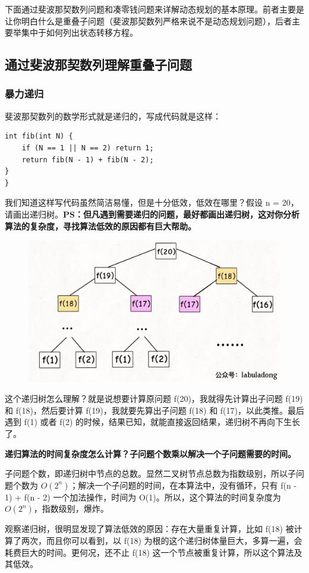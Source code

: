 \documentclass[12pt]{article}
\begin{document}
下面通过斐波那契数列问题和凑零钱问题来详解动态规划的基本原理。前者主要是让你明白什么是重叠子问题（斐波那契数列严格来说不是动态规划问题），后者主要举集中于如何列出状态转移方程。

\subsection{通过斐波那契数列理解重叠子问题}
\subsubsection{暴力递归}
斐波那契数列的数学形式就是递归的，写成代码就是这样：
\begin{lstlisting}
int fib(int N) {
    if (N == 1 || N == 2) return 1;
    return fib(N - 1) + fib(N - 2);
}
}
\end{lstlisting}

我们知道这样写代码虽然简洁易懂，但是十分低效，低效在哪里？假设 n = 20，请画出递归树。\textbf{PS：但凡遇到需要递归的问题，最好都画出递归树，这对你分析算法的复杂度，寻找算法低效的原因都有巨大帮助。}
\begin{figure}[H]
    \centering
    \includegraphics[width=.5\textwidth]{fig/Dynamic_Programming_Recursion_Tree_1.jpg}
\end{figure}

这个递归树怎么理解？就是说想要计算原问题 f(20)，我就得先计算出子问题 f(19) 和 f(18)，然后要计算 f(19)，我就要先算出子问题 f(18) 和 f(17)，以此类推。最后遇到 f(1) 或者 f(2) 的时候，结果已知，就能直接返回结果，递归树不再向下生长了。

\textbf{递归算法的时间复杂度怎么计算？子问题个数乘以解决一个子问题需要的时间。}

子问题个数，即递归树中节点的总数。显然二叉树节点总数为指数级别，所以子问题个数为 $O(2^n)$；解决一个子问题的时间，在本算法中，没有循环，只有 f(n - 1) + f(n - 2) 一个加法操作，时间为 O(1)。所以，这个算法的时间复杂度为  $O(2^n)$，指数级别，爆炸。

观察递归树，很明显发现了算法低效的原因：存在大量重复计算，比如 f(18) 被计算了两次，而且你可以看到，以 f(18) 为根的这个递归树体量巨大，多算一遍，会耗费巨大的时间。更何况，还不止 f(18) 这一个节点被重复计算，所以这个算法及其低效。
\end{document}
